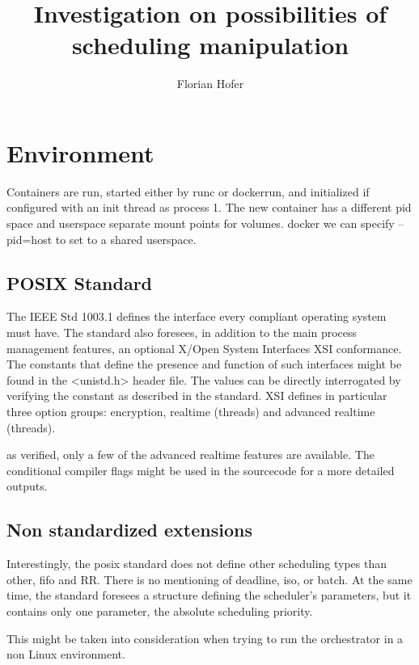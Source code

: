 \documentclass[]{scrartcl}
\title{Investigation on possibilities of scheduling manipulation}
\author{Florian Hofer}
\begin{document}
\maketitle

%

\section{Environment}

Containers are run, started either by runc or dockerrun, and initialized if configured with an init thread as process 1. 
The new container has a different pid space and userspace
separate mount points for volumes. docker we can specify --pid=host to set to a shared userspace.

\subsection{POSIX Standard}

The IEEE Std 1003.1 defines the interface every compliant operating system must have. The standard also foresees, in addition to the main process management features, an optional X/Open System Interfaces XSI conformance.
The constants that define the presence and function of such interfaces might be found in the <unistd.h> header file. 
The values can be directly interrogated by verifying the constant as described in the standard.
XSI defines in particular three option groups: encryption, realtime (threads) and advanced realtime (threads). 

as verified, only a few of the advanced realtime features are available. 
The conditional compiler flags might be used in the sourcecode for a more detailed outputs. 

\subsection{Non standardized extensions}

Interestingly, the posix standard does not define other scheduling types than other, fifo and RR. 
There is no mentioning of deadline, iso, or batch. 
At the same time, the standard foresees a structure defining the scheduler's parameters, but it contains only one parameter, the absolute scheduling priority.

This might be taken into consideration when trying to run the orchestrator in a non Linux environment.
\end{document}
